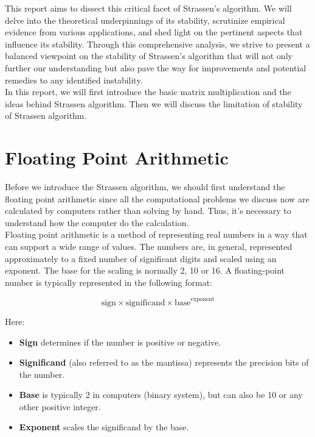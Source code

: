 \documentclass{article}
\begin{document}
This report aims to dissect this critical facet of Strassen's algorithm. We will delve into the theoretical underpinnings of its 
stability, scrutinize empirical evidence from various applications, and shed light on the pertinent aspects that influence its 
stability. Through this comprehensive analysis, we strive to present a balanced viewpoint on the stability of Strassen's algorithm 
that will not only further our understanding but also pave the way for improvements and potential remedies to any identified 
instability.\\

In this report, we will first introduce the basic matrix multiplication and the ideas behind Strassen algorithm. Then we will 
discuss the limitation of stability of Strassen algorithm.

\section{Floating Point Arithmetic}
\hspace{5.5mm}Before we introduce the Strassen algorithm, we should first understand the floating point arithmetic since all the computational
problems we discuss now are calculated by computers rather than solving by hand. Thus, it's necessary to understand how the computer do the
calculation.\\

Floating point arithmetic is a method of representing real numbers in a way that can support a wide range of values. The numbers are, in general,
represented approximately to a fixed number of significant digits and scaled using an exponent. The base for the scaling is normally 2, 10 or 16.
A floating-point number is typically represented in the following format:

\[
\text{{sign}} \times \text{{significand}} \times \text{{base}}^{\text{{exponent}}}
\]

Here:
\begin{itemize}
    \item \textbf{Sign} determines if the number is positive or negative.
    \item \textbf{Significand} (also referred to as the mantissa) represents the precision bits of the number.
    \item \textbf{Base} is typically 2 in computers (binary system), but can also be 10 or any other positive integer.
    \item \textbf{Exponent} scales the significand by the base.
\end{itemize}
\end{document}
